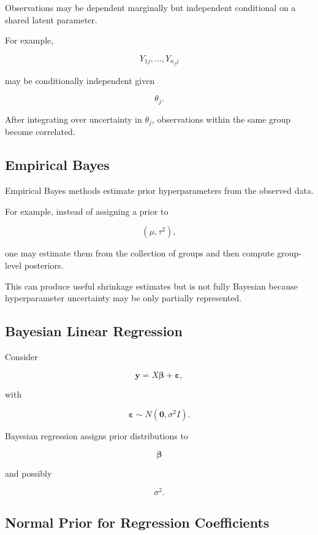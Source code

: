 Observations may be dependent marginally but independent conditional on a
shared latent parameter.

For example,

\[
Y_{1j},
\ldots,
Y_{n_jj}
\]

may be conditionally independent given

\[
\theta_j.
\]

After integrating over uncertainty in \(\theta_j\), observations within
the same group become correlated.

\subsection{Empirical Bayes}
\label{subsec:empirical-bayes}

Empirical Bayes methods estimate prior hyperparameters from the observed
data.

For example, instead of assigning a prior to

\[
(\mu,\tau^2),
\]

one may estimate them from the collection of groups and then compute
group-level posteriors.

This can produce useful shrinkage estimates but is not fully Bayesian
because hyperparameter uncertainty may be only partially represented.

\subsection{Bayesian Linear Regression}
\label{subsec:bayesian-linear-regression}

Consider

\[
\boxed{
\mathbf{y}
=
X\boldsymbol{\beta}
+
\boldsymbol{\varepsilon},
}
\]

with

\[
\boldsymbol{\varepsilon}
\sim
N
(
\mathbf{0},
\sigma^2I
).
\]

Bayesian regression assigns prior distributions to

\[
\boldsymbol{\beta}
\]

and possibly

\[
\sigma^2.
\]

\subsection{Normal Prior for Regression Coefficients}
\label{subsec:normal-prior-regression}

